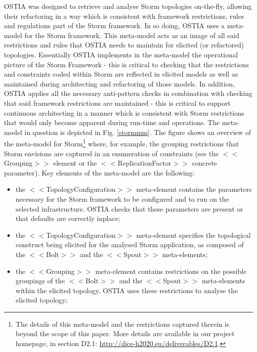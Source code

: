 OSTIA was designed to retrieve and analyse Storm topologies on-the-fly, allowing their refactoring in a way which is consistent with framework restrictions, rules and regulations part of the Storm framework. In so doing, OSTIA uses a meta-model for the Storm framework. This meta-model acts as an image of all said restrictions and rules that OSTIA needs to maintain for elicited (or refactored) topologies. 
Essentially OSTIA implements in the meta-model the operational picture of the Storm Framework - this is critical to checking that the restrictions and constraints coded within Storm are reflected in elicited models as well as maintained during architecting and refactoring of those models. In addition, OSTIA applies all the necessary anti-pattern checks in combination with checking that said framework restrictions are maintained - this is critical to support continuous architecting in a manner which is consistent with Storm restrictions that would only become apparent during run-time and operations.
The meta-model in question is depicted in Fig. \ref{stormmm}. The figure shows an overview of the meta-model for Storm\footnote{The details of this meta-model and the restrictions captured therein is beyond the scope of this paper. More details are available in our project homepage, in section D2.1: \url{http://dice-h2020.eu/deliverables/D2.1}.} where, for example, the grouping restrictions that Storm envisions are captured in an enumeration of constraints (see the $<<$Grouping$>>$ element or the $<<$ReplicationFactor$>>$ concrete parameter). Key elements of the meta-model are the following:
\begin{itemize}
\item the $<<$TopologyConfiguration$>>$ meta-element contains the parameters necessary for the Storm framework to be configured and to run on the selected infrastructure. OSTIA checks that these parameters are present or that defaults are correctly inplace;
\item the $<<$TopologyConfiguration$>>$ meta-element specifies the topological construct being elicited for the analysed Storm application, as composed of the $<<$Bolt$>>$ and  the $<<$Spout$>>$ meta-elements;
\item  the $<<$Grouping$>>$ meta-element contains restrictions on the possible groupings of the $<<$Bolt$>>$ and the $<<$Spout$>>$ meta-elements within the elicited topology. OSTIA uses these restrictions to analyse the elicited topology;
\end{itemize}

